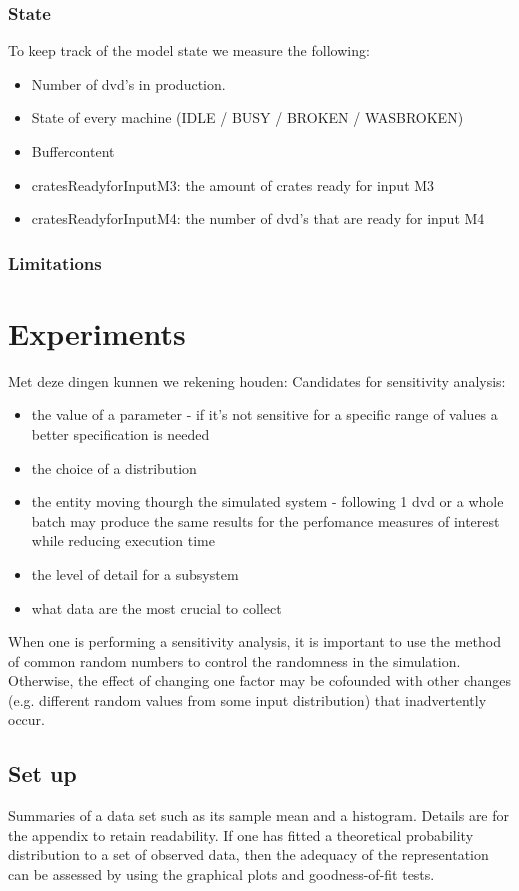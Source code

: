\documentclass[11pt,a4paper]{article}
\begin{document}
\subsubsection{State}
To keep track of the model state we measure the following:
\begin{itemize}
\item Number of dvd's in production.
\item State of every machine (IDLE / BUSY / BROKEN / WASBROKEN)
\item Buffercontent
\item cratesReadyforInputM3: the amount of crates ready for input M3
\item cratesReadyforInputM4: the number of dvd's that are ready for input M4
\end{itemize}

\subsubsection{Limitations}

\section{Experiments}
Met deze dingen kunnen we rekening houden:
Candidates for sensitivity analysis:
\begin{itemize}
\item the value of a parameter - if it's not sensitive for a specific range of values a better specification is needed
\item  the choice of a distribution
\item  the entity moving thourgh the simulated system - following 1 dvd or a whole batch may produce the same results for the perfomance measures of interest while reducing execution time
\item the level of detail for a subsystem
\item  what data are the most crucial to collect 
\end{itemize}
When one is performing a sensitivity analysis, it is important to use the method of common random numbers to control the randomness in the simulation. Otherwise, the effect of changing one factor may be cofounded with other changes (e.g. different random values from some input distribution) that inadvertently occur.

\subsection{Set up}
Summaries of a data set such as its sample mean and a histogram. Details are for the appendix to retain readability. 
If one has fitted a theoretical probability distribution to a set of observed data, then the adequacy of the representation can be assessed by using the graphical plots and goodness-of-fit tests. 
\end{document}
